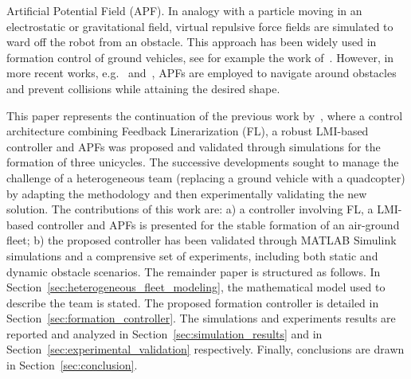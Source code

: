 \documentclass{ifacconf}
\begin{document}
Artificial Potential Field (APF).
In analogy with a particle moving in an electrostatic or gravitational
field, virtual repulsive force fields are simulated to ward off the robot
from an obstacle.
This approach has been widely used in formation control of ground vehicles,
see for example the work of~\cite{Yongshen2018}.
However, in more recent works, e.g.~\cite{HAN2024106105} and~\cite{Piet2025Control},
APFs are employed to navigate around obstacles and prevent collisions 
while attaining the desired shape.

This paper represents the continuation of the previous work by~\cite{Morando2025SOSE},
where a control architecture combining Feedback Linerarization (FL), 
a robust LMI-based controller and APFs was proposed 
and validated through simulations for 
the formation of three unicycles.
The successive developments sought to manage the challenge
of a heterogeneous team (replacing a ground vehicle with a quadcopter)
by adapting the methodology and then experimentally validating 
the new solution.
The contributions of this work are: a) a controller involving FL, a LMI-based controller and APFs 
is presented for the stable formation of an air-ground fleet;
b) the proposed controller has been validated through MATLAB Simulink
simulations and a comprensive set of experiments, including both static
and dynamic obstacle scenarios.
The remainder paper is structured as follows. 
In Section~\ref{sec:heterogeneous_fleet_modeling}, 
the mathematical model used to describe the team is stated.
The proposed formation controller is detailed in Section~\ref{sec:formation_controller}.
The simulations and experiments results are reported and analyzed
in Section~\ref{sec:simulation_results} and 
in Section~\ref{sec:experimental_validation} respectively.
Finally, conclusions are drawn in Section~\ref{sec:conclusion}.
\end{document}
